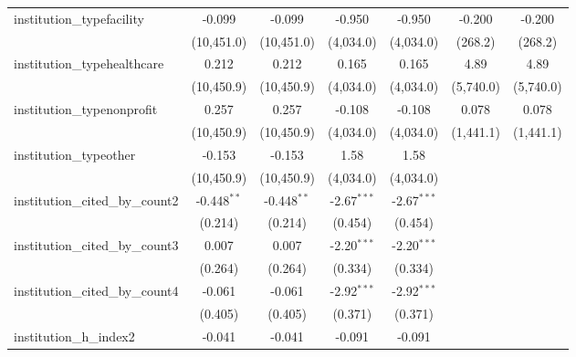 \begin{tabular}{lcccccc}
   institution\_typefacility             & -0.099         & -0.099         & -0.950        & -0.950        & -0.200        & -0.200\\   
                                         & (10,451.0)     & (10,451.0)     & (4,034.0)     & (4,034.0)     & (268.2)       & (268.2)\\   
   institution\_typehealthcare           & 0.212          & 0.212          & 0.165         & 0.165         & 4.89          & 4.89\\   
                                         & (10,450.9)     & (10,450.9)     & (4,034.0)     & (4,034.0)     & (5,740.0)     & (5,740.0)\\   
   institution\_typenonprofit            & 0.257          & 0.257          & -0.108        & -0.108        & 0.078         & 0.078\\   
                                         & (10,450.9)     & (10,450.9)     & (4,034.0)     & (4,034.0)     & (1,441.1)     & (1,441.1)\\   
   institution\_typeother                & -0.153         & -0.153         & 1.58          & 1.58          &               &   \\   
                                         & (10,450.9)     & (10,450.9)     & (4,034.0)     & (4,034.0)     &               &   \\   
   institution\_cited\_by\_count2        & -0.448$^{**}$  & -0.448$^{**}$  & -2.67$^{***}$ & -2.67$^{***}$ &               &   \\   
                                         & (0.214)        & (0.214)        & (0.454)       & (0.454)       &               &   \\   
   institution\_cited\_by\_count3        & 0.007          & 0.007          & -2.20$^{***}$ & -2.20$^{***}$ &               &   \\   
                                         & (0.264)        & (0.264)        & (0.334)       & (0.334)       &               &   \\   
   institution\_cited\_by\_count4        & -0.061         & -0.061         & -2.92$^{***}$ & -2.92$^{***}$ &               &   \\   
                                         & (0.405)        & (0.405)        & (0.371)       & (0.371)       &               &   \\   
   institution\_h\_index2                & -0.041         & -0.041         & -0.091        & -0.091        &               &   \\   

\end{tabular}
